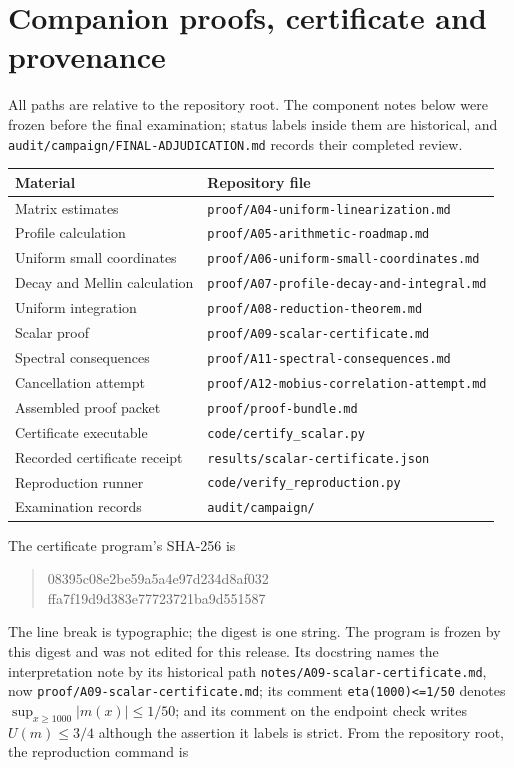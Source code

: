 \documentclass[11pt]{article}
\theoremstyle{remark}\newtheorem{remark}[theorem]{Remark}
\begin{document}
\appendix
\section{Companion proofs, certificate and provenance}\label{app:files}
All paths are relative to the repository root. The component notes below were frozen before the final examination; status labels inside them are historical, and \texttt{audit/campaign/FINAL-ADJUDICATION.md} records their completed review.
\begin{center}\small
\begin{tabular}{@{}ll@{}}\toprule
Material & Repository file\\\midrule
Matrix estimates & \texttt{proof/A04-uniform-linearization.md}\\
Profile calculation & \texttt{proof/A05-arithmetic-roadmap.md}\\
Uniform small coordinates & \texttt{proof/A06-uniform-small-coordinates.md}\\
Decay and Mellin calculation & \texttt{proof/A07-profile-decay-and-integral.md}\\
Uniform integration & \texttt{proof/A08-reduction-theorem.md}\\
Scalar proof & \texttt{proof/A09-scalar-certificate.md}\\
Spectral consequences & \texttt{proof/A11-spectral-consequences.md}\\
Cancellation attempt & \texttt{proof/A12-mobius-correlation-attempt.md}\\
Assembled proof packet & \texttt{proof/proof-bundle.md}\\
Certificate executable & \texttt{code/certify\_scalar.py}\\
Recorded certificate receipt & \texttt{results/scalar-certificate.json}\\
Reproduction runner & \texttt{code/verify\_reproduction.py}\\
Examination records & \texttt{audit/campaign/}\\\bottomrule
\end{tabular}
\end{center}
The certificate program's SHA-256 is
\begin{quote}\small\ttfamily
08395c08e2be59a5a4e97d234d8af032\\
ffa7f19d9d383e77723721ba9d551587
\end{quote}
The line break is typographic; the digest is one string. The program is frozen by this digest and was not edited for this release. Its docstring names the interpretation note by its historical path \texttt{notes/A09-scalar-certificate.md}, now \texttt{proof/A09-scalar-certificate.md}; its comment \texttt{eta(1000)<=1/50} denotes $\sup_{x\ge1000}|m(x)|\le1/50$; and its comment on the endpoint check writes $U(m)\le3/4$ although the assertion it labels is strict. From the repository root, the reproduction command is
\end{document}
